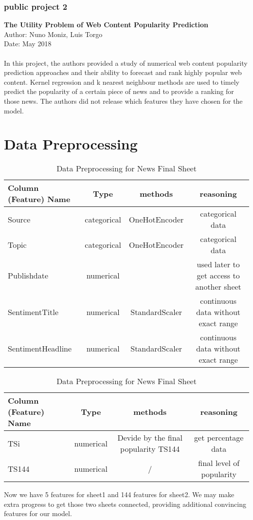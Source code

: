 \documentclass[10pt]{article}
\begin{document}
\subsubsection{public project 2}
\textbf{The Utility Problem of Web Content Popularity Prediction}\\
Author: Nuno Moniz, Luis Torgo\\
Date: May 2018\\
\\
In this project, the authors provided a study of numerical web content popularity 
prediction approaches and their ability to forecast and rank highly popular web content.
Kernel regression and k nearest neighbour methods are used to timely predict the popularity 
of a certain piece of news and to provide a ranking for those news. The authors did not 
release which features they have chosen for the model.\\


\section{Data Preprocessing}

\begin{table}[h!]
    \begin{center}
      \caption{Data Preprocessing for News Final Sheet}
      \label{tab:table3}
      \begin{tabular}{l|c|c|c} 
        \textbf{Column (Feature) Name} & \textbf{Type} & \textbf{methods} & \textbf{reasoning}\\
        \hline
        Source & categorical & OneHotEncoder & categorical data\\
        Topic & categorical & OneHotEncoder & categorical data\\
        Publishdate & numerical &  & used later to get access to another sheet \\
        SentimentTitle & numerical & StandardScaler & continuous data without exact range\\
        SentimentHeadline & numerical & StandardScaler & continuous data without exact range\\
      \end{tabular}
    \end{center}
\end{table}


  \begin{table}[h!]
    \begin{center}
      \caption{Data Preprocessing for News Final Sheet}
      \label{tab:table3}
      \begin{tabular}{l|c|c|c} 
        \textbf{Column (Feature) Name} & \textbf{Type} & \textbf{methods} & \textbf{reasoning}\\
        \hline
        TSi & numerical & Devide by the final popularity TS144 & get percentage data\\
        
        TS144 & numerical & / & final level of popularity\\
      
      \end{tabular}
    \end{center}
\end{table}

Now we have 5 features for sheet1 and 144 features for sheet2. We may make extra progress to get 
those two sheets connected, providing additional convincing features for our model.
\end{document}
